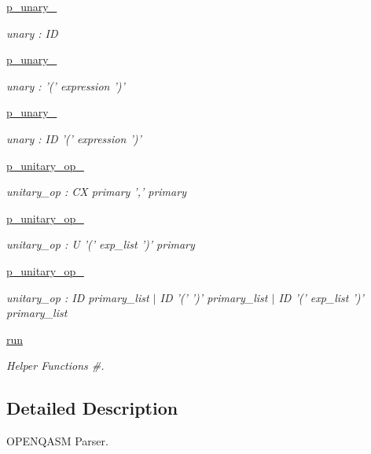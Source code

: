 \begin{DoxyCompactItemize}
\hyperlink{namespaceqat_1_1interop_1_1qasm__parser_1_1OqasmParser_1_1p__unary__3}{p\-\_\-unary\-\_}
\begin{DoxyCompactList}\small\item\em unary \-: I\-D \end{DoxyCompactList}\item 
\hyperlink{namespaceqat_1_1interop_1_1qasm__parser_1_1OqasmParser_1_1p__unary__4}{p\-\_\-unary\-\_}
\begin{DoxyCompactList}\small\item\em unary \-: '(' expression ')' \end{DoxyCompactList}\item 
\hyperlink{namespaceqat_1_1interop_1_1qasm__parser_1_1OqasmParser_1_1p__unary__6}{p\-\_\-unary\-\_}
\begin{DoxyCompactList}\small\item\em unary \-: I\-D '(' expression ')' \end{DoxyCompactList}\item 
\hyperlink{namespaceqat_1_1interop_1_1qasm__parser_1_1OqasmParser_1_1p__unitary__op__1}{p\-\_\-unitary\-\_\-op\-\_}
\begin{DoxyCompactList}\small\item\em unitary\-\_\-op \-: C\-X primary ',' primary \end{DoxyCompactList}\item 
\hyperlink{namespaceqat_1_1interop_1_1qasm__parser_1_1OqasmParser_1_1p__unitary__op__2}{p\-\_\-unitary\-\_\-op\-\_}
\begin{DoxyCompactList}\small\item\em unitary\-\_\-op \-: U '(' exp\-\_\-list ')' primary \end{DoxyCompactList}\item 
\hyperlink{namespaceqat_1_1interop_1_1qasm__parser_1_1OqasmParser_1_1p__unitary__op__3}{p\-\_\-unitary\-\_\-op\-\_}
\begin{DoxyCompactList}\small\item\em unitary\-\_\-op \-: I\-D primary\-\_\-list $|$ I\-D '(' ')' primary\-\_\-list $|$ I\-D '(' exp\-\_\-list ')' primary\-\_\-list \end{DoxyCompactList}\item 
\hyperlink{namespaceqat_1_1interop_1_1qasm__parser_1_1OqasmParser_1_1run}{run}
\begin{DoxyCompactList}\small\item\em Helper Functions \#. \end{DoxyCompactList}\end{DoxyCompactItemize}


\subsection{Detailed Description}
O\-P\-E\-N\-Q\-A\-S\-M Parser. 